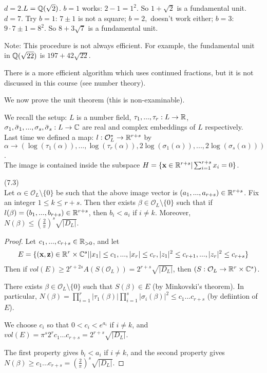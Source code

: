 \documentclass[a4paper]{article}
\begin{document}
\begin{eg}
$d=2$.$L = \mathbb{Q}(\sqrt{2})$. $b=1$ works: $2-1=1^2$. So $1+\sqrt{2}$ is a fundamental unit.\\
$d=7$. Try $b=1$: $7 \pm 1$ is not a square; $b=2,$ doesn't work either; $b=3$: $9 \cdot 7 \pm 1 = 8^2$. So $8+3\sqrt{7}$ is a fundamental unit.
\end{eg}

Note: This procedure is not always efficient. For example, the fundamental unit in $\mathbb{Q}(\sqrt{22})$ is $197+42\sqrt{22}$.

There is a more efficient algorithm which uses continued fractions, but it is not discussed in this course (see number theory).

We now prove the unit theorem (this is non-examinable).

We recall the setup: $L$ is a number field, $\tau_1,...,\tau_r: L \to \mathbb{R}$, $\sigma_1,\bar{\sigma}_1,...,\sigma_s,\bar{\sigma}_s:L \to \mathbb{C}$ are real and complex embeddings of $L$ respectively.\\
Last time we defined a map: $l: \mathcal{O}_L^* \to \mathbb{R}^{r+s}$ by $\alpha \to (\log (\tau_1(\alpha)),...,\log(\tau_r (\alpha)),2\log (\sigma_1(\alpha)),...,2\log(\sigma_s(\alpha)))$.\\
The image is contained inside the subspace $H = \{\mathbf{x} \in \mathbb{R}^{r+s}| \sum_{i=1}^{r+s} x_i = 0\}$.

\begin{lemma} (7.3)\\
Let $\alpha \in \mathcal{O}_L \setminus \{0\}$ be such that the above image vector is $(a_1,...,a_{r+s}) \in \mathbb{R}^{r+s}$. Fix an integer $1 \leq k \leq r+s$. Then ther exists $\beta \in \mathcal{O}_L \setminus\{0\}$ such that if $l(\beta) = (b_1,...,b_{r+s}) \in \mathbb{R}^{r+s}$, then $b_i < a_i$ if $i \neq k$. Moreover, $N(\beta) \leq (\frac{2}{\pi})^s \sqrt{|D_L|}$.
\begin{proof}
Let $c_1,...,c_{r+s} \in \mathbb{R}_{>0}$, and let
\begin{equation*}
\begin{aligned}
E=\{(\mathbf{x},\mathbf{z})\in \mathbb{R}^r \times \mathbb{C}^s | |x_1| \leq c_1,...,|x_r| \leq c_r,|z_1|^2 \leq c_{r+1},...,|z_r|^2 \leq c_{r+s}\}
\end{aligned}
\end{equation*}
Then if $vol(E) \geq 2^{r+2s} A(S(\mathcal{O}_L)) = 2^{r+s} \sqrt{|D_L|}$, then $(S:\mathcal{O}_L \to \mathbb{R}^r \times \mathbb{C}^s)$.

There exists $\beta \in \mathcal{O}_L \setminus \{0\}$ such that $S(\beta) \in E$ (by Minkovski's theorem). In particular, $N(\beta) = \prod_{i=1}^r |\tau_1(\beta)| \prod_{i=1}^s |\sigma_i(\beta)|^2 \leq c_1...c_{r+s}$ (by defiintion of $E$).

We choose $c_i$ so that $0 < c_i < e^{a_i}$ if $i \neq k$, and $vol(E) = \pi^s 2^r c_1...c_{r+s} = 2^{r+s} \sqrt{|D_L|}$.

The first property gives $b_i < a_i$ if $i \neq k$, and the second property gives $N(\beta) \geq c_1...c_{r+s} = (\frac{2}{\pi})^s \sqrt{|D_L|}$.
\end{proof}
\end{lemma}
\end{document}
